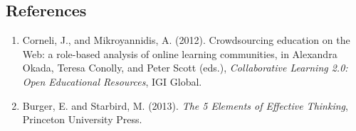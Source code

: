 \subsection{References}

\begin{enumerate}
\itemsep1pt\parskip0pt
\item
  Corneli, J., and Mikroyannidis, A. (2012). Crowdsourcing education on
  the Web: a role-based analysis of online learning communities, in
  Alexandra Okada, Teresa Conolly, and Peter Scott (eds.), \emph{Collaborative
  Learning 2.0: Open Educational Resources}, IGI Global.
\item
  Burger, E. and Starbird, M. (2013). \emph{The 5 Elements of Effective
  Thinking}, Princeton University Press.
\end{enumerate}

